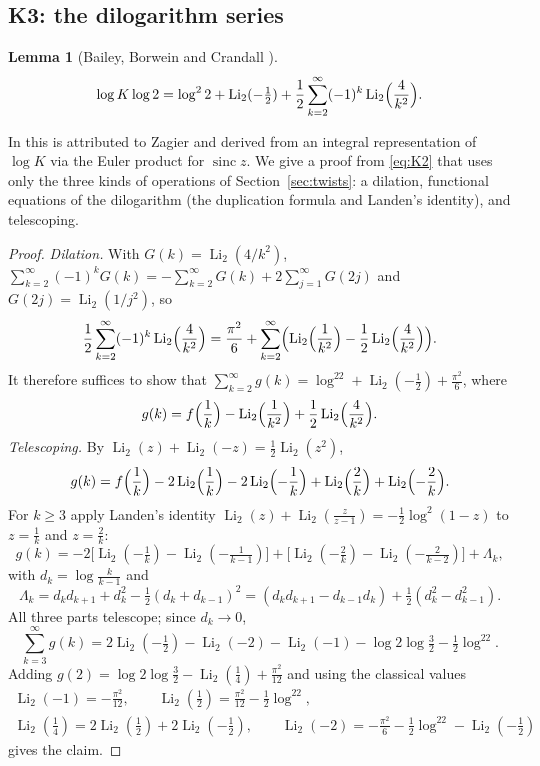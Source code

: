 \documentclass[11pt,reqno]{amsart}
\newtheorem{lemma}[theorem]{Lemma}
\theoremstyle{definition}
\theoremstyle{remark}
\newcommand{\sinc}{\operatorname{sinc}}
\newcommand{\Li}{\operatorname{Li}}
\begin{document}
\subsection{K3: the dilogarithm series}\label{sec:dilog}

\begin{lemma}[{Bailey, Borwein and Crandall \cite[\S3]{BBC97}}]\label{lem:dilog}
\[
  \log K \log 2 = \log^2 2 + \Li_2(-\tfrac12) + \frac12\sum_{k=2}^{\infty}(-1)^k \Li_2\Bigl(\frac{4}{k^2}\Bigr).
\]
\end{lemma}

In \cite{BBC97} this is attributed to Zagier and derived from an integral representation of $\log K$ via the Euler
product for $\sinc z$. We give a proof from \eqref{eq:K2} that uses only the three kinds of operations of
Section~\ref{sec:twists}: a dilation, functional equations of the dilogarithm (the duplication formula and
Landen's identity), and telescoping.

\begin{proof}
\emph{Dilation.} With $G(k) = \Li_2(4/k^2)$, $\sum_{k=2}^{\infty}(-1)^kG(k) = -\sum_{k=2}^{\infty}G(k) + 2\sum_{j=1}^{\infty}G(2j)$ and
$G(2j) = \Li_2(1/j^2)$, so
\[
  \frac12\sum_{k=2}^{\infty}(-1)^k\Li_2\Bigl(\frac4{k^2}\Bigr)
  = \frac{\pi^2}{6} + \sum_{k=2}^{\infty}\Bigl(\Li_2\Bigl(\frac1{k^2}\Bigr) - \frac12\Li_2\Bigl(\frac4{k^2}\Bigr)\Bigr).
\]
It therefore suffices to show that $\sum_{k=2}^{\infty} g(k) = \log^22 + \Li_2(-\frac12) + \frac{\pi^2}6$, where
\[
  g(k) = f\Bigl(\frac1k\Bigr) - \Li_2\Bigl(\frac1{k^2}\Bigr) + \frac12\Li_2\Bigl(\frac4{k^2}\Bigr).
\]
\emph{Telescoping.} By $\Li_2(z) + \Li_2(-z) = \frac12\Li_2(z^2)$,
\[
  g(k) = f\Bigl(\frac1k\Bigr) - 2\Li_2\Bigl(\frac1k\Bigr) - 2\Li_2\Bigl(-\frac1k\Bigr) + \Li_2\Bigl(\frac2k\Bigr) + \Li_2\Bigl(-\frac2k\Bigr).
\]
For $k \ge 3$ apply Landen's identity $\Li_2(z) + \Li_2(\frac{z}{z-1}) = -\frac12\log^2(1-z)$ to $z = \frac1k$ and
$z = \frac2k$:
\[
  g(k) = -2\bigl[\Li_2(-\tfrac1k) - \Li_2(-\tfrac1{k-1})\bigr] + \bigl[\Li_2(-\tfrac2k) - \Li_2(-\tfrac2{k-2})\bigr]
  + \Lambda_k,
\]
with $d_k = \log\frac{k}{k-1}$ and
\[
  \Lambda_k = d_kd_{k+1} + d_k^2 - \tfrac12(d_k + d_{k-1})^2 = (d_kd_{k+1} - d_{k-1}d_k) + \tfrac12(d_k^2 - d_{k-1}^2).
\]
All three parts telescope; since $d_k \to 0$,
\[
  \sum_{k=3}^{\infty} g(k) = 2\Li_2(-\tfrac12) - \Li_2(-2) - \Li_2(-1) - \log2\log\tfrac32 - \tfrac12\log^22 .
\]
Adding $g(2) = \log2\log\frac32 - \Li_2(\frac14) + \frac{\pi^2}{12}$ and using the classical values
\begin{gather*}
  \Li_2(-1) = -\frac{\pi^2}{12}, \qquad \Li_2(\tfrac12) = \frac{\pi^2}{12} - \frac12\log^22, \\
  \Li_2(\tfrac14) = 2\Li_2(\tfrac12) + 2\Li_2(-\tfrac12), \qquad
  \Li_2(-2) = -\frac{\pi^2}6 - \frac12\log^22 - \Li_2(-\tfrac12)
\end{gather*}
gives the claim.
\end{proof}
\end{document}
